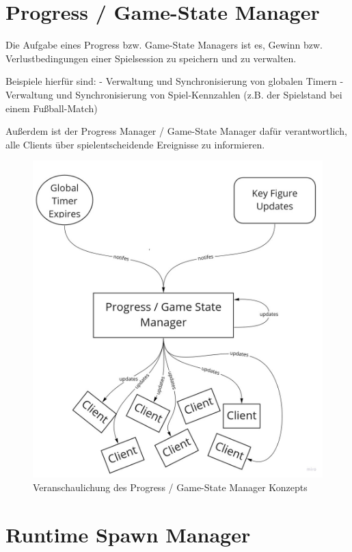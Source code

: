 \section{Progress / Game-State Manager}

Die Aufgabe eines Progress bzw. Game-State Managers ist es, Gewinn bzw. Verlustbedingungen einer Spielsession zu speichern und zu verwalten. 

Beispiele hierfür sind:
- Verwaltung und Synchronisierung von globalen Timern
- Verwaltung und Synchronisierung von Spiel-Kennzahlen (z.B. der Spielstand bei einem Fußball-Match)

Außerdem ist der Progress Manager / Game-State Manager dafür verantwortlich, alle Clients über spielentscheidende Ereignisse zu informieren. 

\begin{figure}
	\centering
	\includegraphics[width=150mm]{images/Progress_State_Manager.jpg}
	\caption[Progress / Game-State Manager]{Veranschaulichung des Progress / Game-State Manager Konzepts}
	\label{pic:Progress_State_Manager}
\end{figure}

\section{Runtime Spawn Manager}


